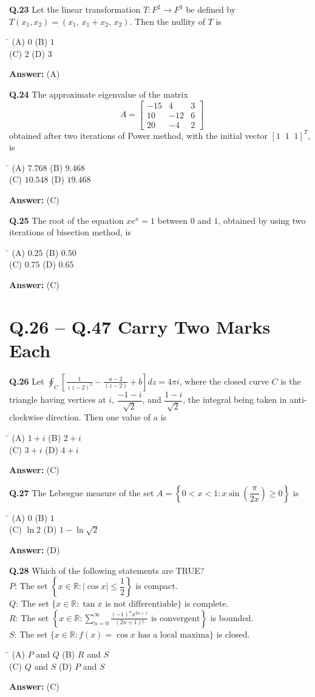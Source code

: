 \documentclass[11pt,a4paper]{article}
\newcommand{\optsfourA}[4]{%
  \begin{tabbing}
    \hspace{0.48\linewidth}\=\kill
    (A) #1 \> (B) #2 \\[2pt]
    (C) #3 \> (D) #4
  \end{tabbing}%
}
\newcommand{\ans}[1]{\textbf{Answer:} #1\par\medskip}
\begin{document}
\textbf{Q.23} Let the linear transformation $T : F^2 \to F^3$ be defined by $T(x_1, x_2) = (x_1,\, x_1 + x_2,\, x_2)$. Then the nullity of $T$ is
\optsfourA{$0$}{$1$}{$2$}{$3$}
\ans{(A)}

\textbf{Q.24} The approximate eigenvalue of the matrix
\[
  A = \begin{bmatrix}
    -15 & 4 & 3 \\
    10 & -12 & 6 \\
    20 & -4 & 2
  \end{bmatrix}
\]
obtained after two iterations of Power method, with the initial vector $[1\;\;1\;\;1]^T$, is
\optsfourA{$7.768$}{$9.468$}{$10.548$}{$19.468$}
\ans{(C)}

\textbf{Q.25} The root of the equation $x e^x = 1$ between $0$ and $1$, obtained by using two iterations of bisection method, is
\optsfourA{$0.25$}{$0.50$}{$0.75$}{$0.65$}
\ans{(C)}

\section*{Q.26 -- Q.47 Carry Two Marks Each}

\textbf{Q.26} Let $\displaystyle\oint_C \left[\frac{1}{(z - 2)^2} - \frac{a - 2}{(z - 2)} + b\right]dz = 4\pi i$, where the closed curve $C$ is the triangle having vertices at $i$, $\dfrac{-1 - i}{\sqrt{2}}$, and $\dfrac{1 - i}{\sqrt{2}}$, the integral being taken in anti-clockwise direction. Then one value of $a$ is
\optsfourA{$1 + i$}{$2 + i$}{$3 + i$}{$4 + i$}
\ans{(C)}

\textbf{Q.27} The Lebesgue measure of the set $A = \left\{0 < x < 1 : x\sin\!\left(\dfrac{\pi}{2x}\right) \ge 0\right\}$ is
\optsfourA{$0$}{$1$}{$\ln 2$}{$1 - \ln\sqrt{2}$}
\ans{(D)}

\textbf{Q.28} Which of the following statements are TRUE?\\
$P$: The set $\left\{x \in \mathbb{R} : |\cos x| \le \dfrac{1}{2}\right\}$ is compact.\\
$Q$: The set $\{x \in \mathbb{R} : \tan x \text{ is not differentiable}\}$ is complete.\\
$R$: The set $\left\{x \in \mathbb{R} : \displaystyle\sum_{n=0}^{\infty} \frac{(-1)^n x^{2n+1}}{(2n+1)!} \text{ is convergent}\right\}$ is bounded.\\
$S$: The set $\{x \in \mathbb{R} : f(x) = \cos x \text{ has a local maxima}\}$ is closed.
\optsfourA{$P$ and $Q$}{$R$ and $S$}{$Q$ and $S$}{$P$ and $S$}
\ans{(C)}
\end{document}
